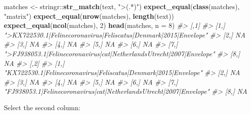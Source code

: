 \documentclass[]{book}
\newenvironment{Shaded}{}{}
\newcommand{\CommentTok}[1]{\textcolor[rgb]{0.38,0.63,0.69}{\textit{#1}}}
\newcommand{\DataTypeTok}[1]{\textcolor[rgb]{0.56,0.13,0.00}{#1}}
\newcommand{\DecValTok}[1]{\textcolor[rgb]{0.25,0.63,0.44}{#1}}
\newcommand{\KeywordTok}[1]{\textcolor[rgb]{0.00,0.44,0.13}{\textbf{#1}}}
\newcommand{\NormalTok}[1]{#1}
\newcommand{\OperatorTok}[1]{\textcolor[rgb]{0.40,0.40,0.40}{#1}}
\newcommand{\StringTok}[1]{\textcolor[rgb]{0.25,0.44,0.63}{#1}}
\begin{document}
\begin{Shaded}
\begin{Highlighting}[]
\NormalTok{matches <-}\StringTok{ }\NormalTok{stringr}\OperatorTok{::}\KeywordTok{str_match}\NormalTok{(text, }\StringTok{">(.*)"}\NormalTok{)}
\KeywordTok{expect_equal}\NormalTok{(}\KeywordTok{class}\NormalTok{(matches), }\StringTok{"matrix"}\NormalTok{)}
\KeywordTok{expect_equal}\NormalTok{(}\KeywordTok{nrow}\NormalTok{(matches), }\KeywordTok{length}\NormalTok{(text))}
\KeywordTok{expect_equal}\NormalTok{(}\KeywordTok{ncol}\NormalTok{(matches), }\DecValTok{2}\NormalTok{)}
\KeywordTok{head}\NormalTok{(matches, }\DataTypeTok{n =} \DecValTok{8}\NormalTok{)}
\CommentTok{#>      [,1]                                                                }
\CommentTok{#> [1,] ">KX722530.1|Felinecoronavirus|Feliscatus|Denmark|2015|Envelope"    }
\CommentTok{#> [2,] NA                                                                  }
\CommentTok{#> [3,] NA                                                                  }
\CommentTok{#> [4,] NA                                                                  }
\CommentTok{#> [5,] NA                                                                  }
\CommentTok{#> [6,] NA                                                                  }
\CommentTok{#> [7,] ">FJ938053.1|Felinecoronavirus|cat|NetherlandsUtrecht|2007|Envelope"}
\CommentTok{#> [8,] NA                                                                  }
\CommentTok{#>      [,2]                                                               }
\CommentTok{#> [1,] "KX722530.1|Felinecoronavirus|Feliscatus|Denmark|2015|Envelope"    }
\CommentTok{#> [2,] NA                                                                 }
\CommentTok{#> [3,] NA                                                                 }
\CommentTok{#> [4,] NA                                                                 }
\CommentTok{#> [5,] NA                                                                 }
\CommentTok{#> [6,] NA                                                                 }
\CommentTok{#> [7,] "FJ938053.1|Felinecoronavirus|cat|NetherlandsUtrecht|2007|Envelope"}
\CommentTok{#> [8,] NA}
\end{Highlighting}
\end{Shaded}

Select the second column:
\end{document}
